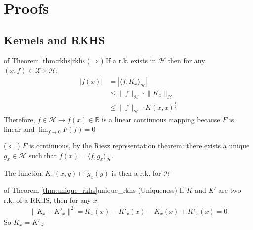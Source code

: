 \documentclass[10pt]{article}
\begin{document}
\section{Proofs}

\subsection{Kernels and RKHS}

\begin{Proof}{of Theorem \ref{thm:rkhs}}{rkhs}
  ($\Rightarrow$) If a r.k. exists in $\mathcal{H}$ then for any $(x,f) \in 
  \mathcal{X} \times \mathcal{H}$:
  \begin{align*}
    |f(x)| &= |\langle f, K_x \rangle_\mathcal{H} |\\
           &\leq \lVert f \rVert_\mathcal{H} \cdot \lVert K_x \rVert_\mathcal{H}
           \tag{Cauchy-Schwarz}\\
           &\leq \lVert f \rVert_\mathcal{H} \cdot K(x,x)^\frac{1}{2}
  \end{align*}
  Therefore, $f\in\mathcal{H} \rightarrow f(x) \in \mathbb{R}$ is a linear 
  continuous mapping because $F$ is linear and $\lim_{f\rightarrow 0} F(f)= 0$

  \vspace{10pt}
  ($\Leftarrow$) $F$ is continuous, by the Riesz representation theorem: there
  exists a unique $g_x \in \mathcal{H}$ such that $f(x) = \langle f, g_x 
  \rangle_\mathcal{H}$.

  The function $K: (x, y) \mapsto g_x(y)$ is then a r.k. for $\mathcal{H}$
\end{Proof}

\begin{Proof}{of Theorem \ref{thm:unique_rkhs}}{unique_rkhs}
  (Uniqueness) If $K$ and $K'$ are two r.k. of a RKHS, then for any $x$
  \begin{align*}
    \lVert K_x - K'_x\rVert^2 = K_x(x) - K'_x(x) - K_x(x) + K'_x(x) = 0
  \end{align*}
  So $K_x = K'_X$

\end{Proof}
\end{document}
